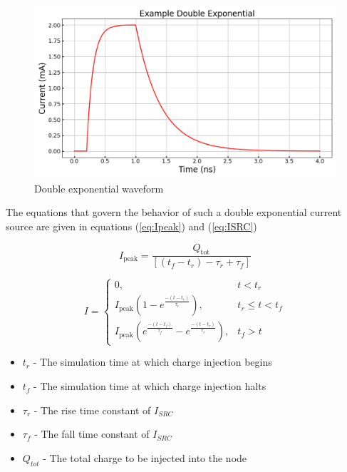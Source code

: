 \documentclass[conference]{IEEEtran}
\begin{document}
    \begin{figure}[htbp]
        \centering
        \includegraphics[width=0.95\linewidth]{EX_Double_Exponential}
        \caption{Double exponential waveform}
        \label{fig:double_exp}
    \end{figure}
    
    The equations that govern the behavior of such a double exponential current source are given in equations (\ref{eq:Ipeak}) and (\ref{eq:ISRC})
    
        \begin{equation}
        I_{\text{peak}} = \frac{Q_{\text{tot}}}{[(t_f - t_r) - \tau_r + \tau_f]}\label{eq:Ipeak}
    \end{equation}

    \begin{equation}
        I = \begin{cases}
                      0, & t < t_r \\
                      I_{\text{peak}}\left(1 - e^{\frac{-(t - t_r)}{\tau_r}}\right), & t_r \leq t < t_f \\
                      I_{\text{peak}}\left(e^{\frac{-(t - t_f)}{\tau_f}} - e^{\frac{-(t - t_r)}{\tau_r}}\right), & t_f > t
        \end{cases}\label{eq:ISRC}
    \end{equation}
    
	\vspace{1em}
    
    \begin{itemize}
        \item[] \(t_r\) - The simulation time at which charge injection begins

        \item[] \(t_f\) - The simulation time at which charge injection halts

        \item[] \(\tau_r\) - The rise time constant of \(I_{SRC}\)

        \item[] \(\tau_f\) - The fall time constant of \(I_{SRC}\)

        \item[] \(Q_{tot}\) - The total charge to be injected into the node
    \end{itemize}
    
\end{document}
